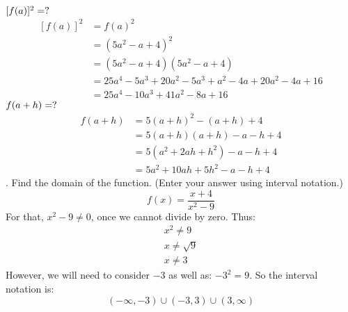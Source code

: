 \documentclass{article}
\begin{document}
\newline\newline
$[f(a)]^2 = \space ?$
\begin{equation}
\begin{split}
    [f(a)]^2 & = f(a) ^ 2 \\
    & = (5a^2 - a + 4)^2 \\
    & = (5a^2 - a + 4) (5a^2 - a + 4) \\
    & = 25a^4 - 5a^3 + 20a^2 - 5a^3  + a^2 - 4a + 20a^2 -4a + 16 \\
    & = 25a^4 - 10a^3 + 41a^2 - 8a + 16
\end{split}
\end{equation}
\newline\newline
$f(a + h) = \space ?$
\begin{equation}
\begin{split}
    f(a + h) & = 5(a + h)^2 - (a + h) + 4 \\
    & = 5(a + h)(a + h) - a - h + 4 \\
    & = 5(a^2 + 2ah + h^2) - a - h + 4 \\
    & = 5a^2 + 10ah + 5h^2 - a - h + 4
\end{split}
\end{equation}
\newline{}. Find the domain of the function. (Enter your answer using interval notation.)
\begin{equation}
    f(x) = \frac{x + 4}{x^2 - 9}
\end{equation}
\newline\newline
For that, $x^2 - 9 \neq 0$, once we cannot divide by zero. Thus:
\begin{equation}
\begin{split}
    x^2 \neq 9 \\
    x \neq \sqrt{9} \\
    x \neq 3
\end{split}
\end{equation}
However, we will need to consider $-3$ as well as: $-3^2=9$.
So the interval notation is: 
\[ (-\infty, -3) \cup (-3,3) \cup (3, \infty) \]
\end{document}
